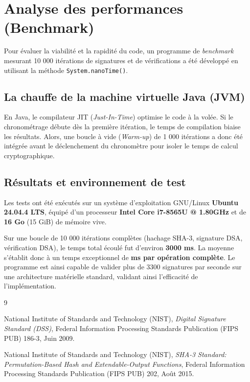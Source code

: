 \documentclass[12pt,a4paper]{article}
\begin{document}

\section{Analyse des performances (Benchmark)}
Pour évaluer la viabilité et la rapidité du code, un programme de \textit{benchmark} mesurant 10 000 itérations de signatures et de vérifications a été développé en utilisant la méthode \texttt{System.nanoTime()}.

\subsection{La chauffe de la machine virtuelle Java (JVM)}
En Java, le compilateur JIT (\textit{Just-In-Time}) optimise le code à la volée. Si le chronométrage débute dès la première itération, le temps de compilation biaise les résultats. Alors, une boucle à vide (\textit{Warm-up}) de 1 000 itérations a donc été intégrée avant le déclenchement du chronomètre pour isoler le temps de calcul cryptographique.

\subsection{Résultats et environnement de test}
Les tests ont été exécutés sur un système d'exploitation GNU/Linux \textbf{Ubuntu 24.04.4 LTS}, équipé d'un processeur \textbf{Intel Core i7-8565U @ 1.80GHz} et de \textbf{16 Go} (15 GiB) de mémoire vive.

Sur une boucle de 10 000 itérations complètes (hachage SHA-3, signature DSA, vérification DSA), le temps total écoulé fut d'environ \textbf{3000 ms}. La moyenne s'établit donc à un temps exceptionnel de \textbf{  ms par opération complète}. Le programme est ainsi capable de valider plus de 3300 signatures par seconde sur une architecture matérielle standard, validant ainsi l'efficacité de l'implémentation.

\newpage
\renewcommand{\refname}{Bibliographie}
\begin{thebibliography}{9}

National Institute of Standards and Technology (NIST), 
\emph{Digital Signature Standard (DSS)}, 
Federal Information Processing Standards Publication (FIPS PUB) 186-3, Juin 2009.

National Institute of Standards and Technology (NIST), 
\emph{SHA-3 Standard: Permutation-Based Hash and Extendable-Output Functions}, 
Federal Information Processing Standards Publication (FIPS PUB) 202, Août 2015.

\end{thebibliography}
\end{document}
